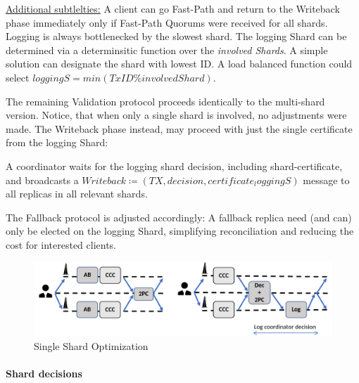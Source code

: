 \underline{Additional subtlelties:} A client can go Fast-Path and return to the Writeback phase immediately only if Fast-Path Quorums were received for all shards. Logging is always bottlenecked by the slowest shard. The logging Shard can be determined via a determinsitic function over the \textit{involved Shards}. A simple solution can designate the shard with lowest ID. A load balanced function could select $loggingS = min(TxID \% involvedShard)$.

The remaining Validation protocol proceeds identically to the multi-shard version. Notice, that when only a single shard is involved, no adjustments were made. The Writeback phase instead, may proceed with just the single certificate from the logging Shard: 

A coordinator waits for the logging shard decision, including shard-certificate, and broadcasts a $Writeback \coloneqq (TX, decision, certificate_loggingS )$ message to all replicas in all relevant shards.

The Fallback protocol is adjusted accordingly: A fallback replica need (and can) only be elected on the logging Shard, simplifying reconciliation and reducing the cost for interested clients. 


\begin{figure}
\begin{center}
\includegraphics[width= \textwidth]{./figures/SingleShard.png}
\end{center}
\caption{Single Shard Optimization}
\label{fig:SingleShardOpt}
\end{figure}



\paragraph{Shard decisions}


